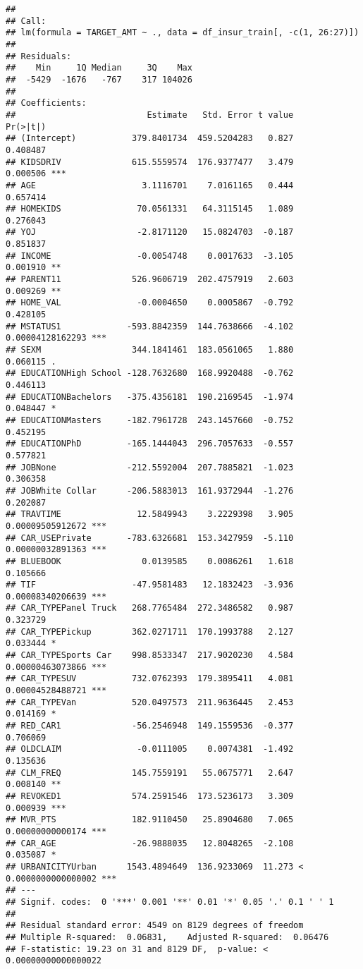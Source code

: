\documentclass[
]{article}
\begin{document}
\begin{verbatim}
## 
## Call:
## lm(formula = TARGET_AMT ~ ., data = df_insur_train[, -c(1, 26:27)])
## 
## Residuals:
##    Min     1Q Median     3Q    Max 
##  -5429  -1676   -767    317 104026 
## 
## Coefficients:
##                          Estimate   Std. Error t value             Pr(>|t|)    
## (Intercept)           379.8401734  459.5204283   0.827             0.408487    
## KIDSDRIV              615.5559574  176.9377477   3.479             0.000506 ***
## AGE                     3.1116701    7.0161165   0.444             0.657414    
## HOMEKIDS               70.0561331   64.3115145   1.089             0.276043    
## YOJ                    -2.8171120   15.0824703  -0.187             0.851837    
## INCOME                 -0.0054748    0.0017633  -3.105             0.001910 ** 
## PARENT11              526.9606719  202.4757919   2.603             0.009269 ** 
## HOME_VAL               -0.0004650    0.0005867  -0.792             0.428105    
## MSTATUS1             -593.8842359  144.7638666  -4.102     0.00004128162293 ***
## SEXM                  344.1841461  183.0561065   1.880             0.060115 .  
## EDUCATIONHigh School -128.7632680  168.9920488  -0.762             0.446113    
## EDUCATIONBachelors   -375.4356181  190.2169545  -1.974             0.048447 *  
## EDUCATIONMasters     -182.7961728  243.1457660  -0.752             0.452195    
## EDUCATIONPhD         -165.1444043  296.7057633  -0.557             0.577821    
## JOBNone              -212.5592004  207.7885821  -1.023             0.306358    
## JOBWhite Collar      -206.5883013  161.9372944  -1.276             0.202087    
## TRAVTIME               12.5849943    3.2229398   3.905     0.00009505912672 ***
## CAR_USEPrivate       -783.6326681  153.3427959  -5.110     0.00000032891363 ***
## BLUEBOOK                0.0139585    0.0086261   1.618             0.105666    
## TIF                   -47.9581483   12.1832423  -3.936     0.00008340206639 ***
## CAR_TYPEPanel Truck   268.7765484  272.3486582   0.987             0.323729    
## CAR_TYPEPickup        362.0271711  170.1993788   2.127             0.033444 *  
## CAR_TYPESports Car    998.8533347  217.9020230   4.584     0.00000463073866 ***
## CAR_TYPESUV           732.0762393  179.3895411   4.081     0.00004528488721 ***
## CAR_TYPEVan           520.0497573  211.9636445   2.453             0.014169 *  
## RED_CAR1              -56.2546948  149.1559536  -0.377             0.706069    
## OLDCLAIM               -0.0111005    0.0074381  -1.492             0.135636    
## CLM_FREQ              145.7559191   55.0675771   2.647             0.008140 ** 
## REVOKED1              574.2591546  173.5236173   3.309             0.000939 ***
## MVR_PTS               182.9110450   25.8904680   7.065     0.00000000000174 ***
## CAR_AGE               -26.9888035   12.8048265  -2.108             0.035087 *  
## URBANICITYUrban      1543.4894649  136.9233069  11.273 < 0.0000000000000002 ***
## ---
## Signif. codes:  0 '***' 0.001 '**' 0.01 '*' 0.05 '.' 0.1 ' ' 1
## 
## Residual standard error: 4549 on 8129 degrees of freedom
## Multiple R-squared:  0.06831,    Adjusted R-squared:  0.06476 
## F-statistic: 19.23 on 31 and 8129 DF,  p-value: < 0.00000000000000022
\end{verbatim}
\end{document}
